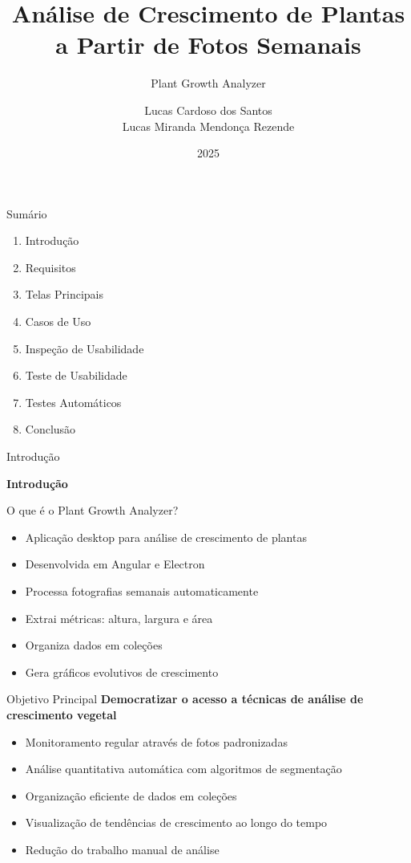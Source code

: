 \documentclass[landscape, 12pt]{beamer}
\title{Análise de Crescimento de Plantas a Partir de Fotos Semanais}
\subtitle{Plant Growth Analyzer}
\author{
    Lucas Cardoso dos Santos \\
    Lucas Miranda Mendonça Rezende
}
\institute{Universidade de São Paulo - Ribeirão Preto}
\date{2025}
\begin{document}
\begin{frame}
    \titlepage
\end{frame}

\begin{frame}{Sumário}
    \begin{enumerate}
        \item Introdução
        \item Requisitos
        \item Telas Principais
        \item Casos de Uso
        \item Inspeção de Usabilidade
        \item Teste de Usabilidade
        \item Testes Automáticos
        \item Conclusão
    \end{enumerate}
\end{frame}

\begin{frame}{Introdução}
    \begin{center}
        \textbf{Introdução}
    \end{center}
\end{frame}

\begin{frame}{O que é o Plant Growth Analyzer?}
    \begin{itemize}
        \item Aplicação desktop para análise de crescimento de plantas
        \item Desenvolvida em Angular e Electron
        \item Processa fotografias semanais automaticamente
        \item Extrai métricas: altura, largura e área
        \item Organiza dados em coleções
        \item Gera gráficos evolutivos de crescimento
    \end{itemize}
\end{frame}

\begin{frame}{Objetivo Principal}
    \textbf{Democratizar o acesso a técnicas de análise de crescimento vegetal}
    
    \vspace{0.5cm}
    \begin{itemize}
        \item Monitoramento regular através de fotos padronizadas
        \item Análise quantitativa automática com algoritmos de segmentação
        \item Organização eficiente de dados em coleções
        \item Visualização de tendências de crescimento ao longo do tempo
        \item Redução do trabalho manual de análise
    \end{itemize}
\end{frame}
\end{document}
